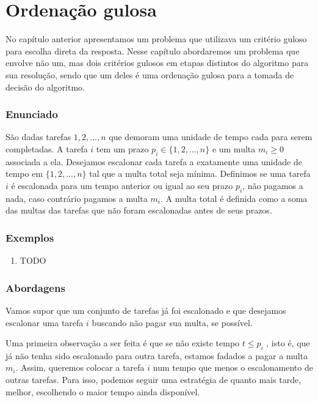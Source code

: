 \chapter{Ordenação gulosa}
\label{ordenacao}

No capítulo anterior apresentamos um problema que utilizava um critério guloso para escolha direta da resposta. Nesse capítulo abordaremos um problema que envolve não um, mas dois critérios gulosos em etapas distintos do algoritmo para sua resolução, sendo que um deles é uma ordenação gulosa para a tomada de decisão do algoritmo.

\subsection*{Enunciado}

São dadas tarefas $1, 2, ..., n$ que demoram uma unidade de tempo cada para serem completadas. A tarefa $i$ tem um prazo $p_i \in \{1, 2, ..., n\}$ e um multa $m_i \geq 0$ associada a ela. Desejamos escalonar cada tarefa a exatamente uma unidade de tempo em $\{1, 2, ..., n\}$ tal que a multa total seja mínima. Definimos se uma tarefa $i$ é escalonada para um tempo anterior ou igual ao seu prazo $p_i$, não pagamos a nada, caso contrário pagamos a multa $m_i$. A multa total é definida como a soma das multas das tarefas que não foram escalonadas antes de seus prazos.

\subsection*{Exemplos}

\begin{enumerate}
    \item TODO
\end{enumerate}

\subsection*{Abordagens}

Vamos supor que um conjunto de tarefas já foi escalonado e que desejamos escalonar uma tarefa $i$ buscando não pagar sua multa, se possível.

Uma primeira observação a ser feita é que se não existe tempo $t \leq p_i$ , isto é, que já não tenha sido escalonado para outra tarefa, estamos fadados a pagar a multa $m_i$. Assim, queremos colocar a tarefa $i$ num tempo que menos  o escalonamento de outras tarefas. Para isso, podemos seguir uma estratégia de quanto mais tarde, melhor, escolhendo o maior tempo ainda disponível.


